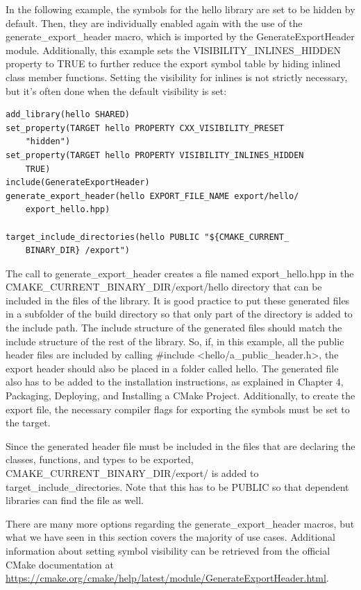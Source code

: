 In the following example, the symbols for the hello library are set to be hidden by default. Then, they are individually enabled again with the use of the generate\_export\_header macro, which is imported by the GenerateExportHeader module. Additionally, this example sets the VISIBILITY\_INLINES\_HIDDEN property to TRUE to further reduce the export symbol table by hiding inlined class member functions. Setting the visibility for inlines is not strictly necessary, but it's often done when the default visibility is set:

\begin{lstlisting}[style=styleCMake]
add_library(hello SHARED)
set_property(TARGET hello PROPERTY CXX_VISIBILITY_PRESET
	"hidden")
set_property(TARGET hello PROPERTY VISIBILITY_INLINES_HIDDEN
	TRUE)
include(GenerateExportHeader)
generate_export_header(hello EXPORT_FILE_NAME export/hello/
	export_hello.hpp)

target_include_directories(hello PUBLIC "${CMAKE_CURRENT_
	BINARY_DIR} /export")
\end{lstlisting}

The call to generate\_export\_header creates a file named export\_hello.hpp in the CMAKE\_CURRENT\_BINARY\_DIR/export/hello directory that can be included in the files of the library. It is good practice to put these generated files in a subfolder of the build directory so that only part of the directory is added to the include path. The include structure of the generated files should match the include structure of the rest of the library. So, if, in this example, all the public header files are included by calling \#include <hello/a\_public\_header.h>, the export header should also be placed in a folder called hello. The generated file also has to be added to the installation instructions, as explained in Chapter 4, Packaging, Deploying, and Installing a CMake Project. Additionally, to create the export file, the necessary compiler flags for exporting the symbols must be set to the target.

Since the generated header file must be included in the files that are declaring the classes, functions, and types to be exported, CMAKE\_CURRENT\_BINARY\_DIR/export/ is added to target\_include\_directories. Note that this has to be PUBLIC so that dependent libraries can find the file as well.

There are many more options regarding the generate\_export\_header macros, but what we have seen in this section covers the majority of use cases. Additional information about setting symbol visibility can be retrieved from the official CMake documentation at \url{https://cmake.org/cmake/help/latest/module/GenerateExportHeader.html}.

